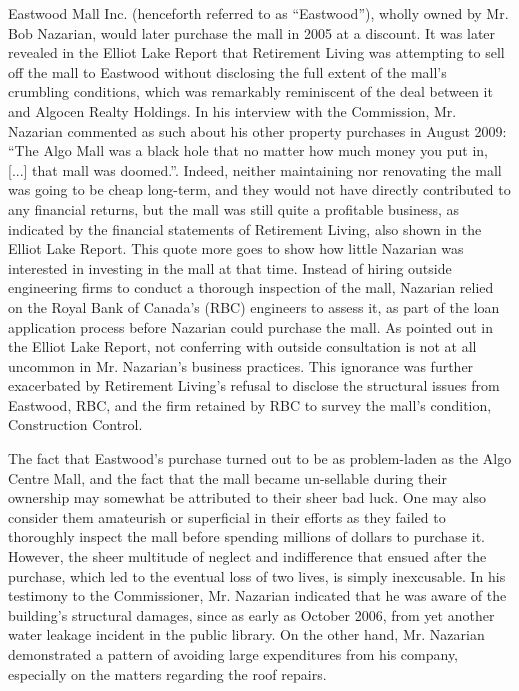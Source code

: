 \documentclass[12pt]{article}
\begin{document}
Eastwood Mall Inc. (henceforth referred to as ``Eastwood''), wholly owned by Mr. Bob Nazarian, would later purchase the mall in 2005 at a discount. It was later revealed in the Elliot Lake Report that Retirement Living was attempting to sell off the mall to Eastwood without disclosing the full extent of the mall's crumbling conditions, which was remarkably reminiscent of the deal between it and Algocen Realty Holdings. In his interview with the Commission, Mr. Nazarian commented as such about his other property purchases in August 2009: ``The Algo Mall was a black hole that no matter how much money you put in, [...] that mall was doomed.''\cite{AlgoLakeReport1}. Indeed, neither maintaining nor renovating the mall was going to be cheap long-term, and they would not have directly contributed to any financial returns, but the mall was still quite a profitable business, as indicated by the financial statements of Retirement Living, also shown in the Elliot Lake Report. This quote more goes to show how little Nazarian was interested in investing in the mall at that time. Instead of hiring outside engineering firms to conduct a thorough inspection of the mall, Nazarian relied on the Royal Bank of Canada's (RBC) engineers to assess it, as part of the loan application process before Nazarian could purchase the mall. As pointed out in the Elliot Lake Report, not conferring with outside consultation is not at all uncommon in Mr. Nazarian's business practices. This ignorance was further exacerbated by Retirement Living's refusal to disclose the structural issues from Eastwood, RBC, and the firm retained by RBC to survey the mall's condition, Construction Control. 

The fact that Eastwood's purchase turned out to be as problem-laden as the Algo Centre Mall, and the fact that the mall became un-sellable during their ownership may somewhat be attributed to their sheer bad luck. One may also consider them amateurish or superficial in their efforts as they failed to thoroughly inspect the mall before spending millions of dollars to purchase it. However, the sheer multitude of neglect and indifference that ensued after the purchase, which led to the eventual loss of two lives, is simply inexcusable. In his testimony to the Commissioner, Mr. Nazarian indicated that he was aware of the building's structural damages, since as early as October 2006, from yet another water leakage incident in the public library. On the other hand, Mr. Nazarian demonstrated a pattern of avoiding large expenditures from his company, especially on the matters regarding the roof repairs. 
\end{document}
